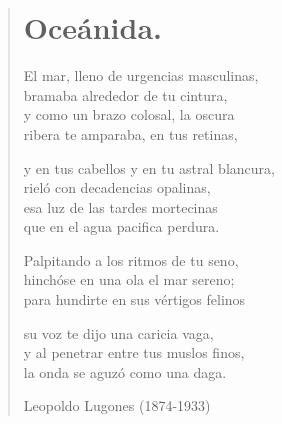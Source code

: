 \documentclass[12pt, twoside]{book}
\begin{document}
\begin{verse}
\begin{center}
\section{Oceánida.}
\end{center}

El mar, lleno de urgencias masculinas,\\
bramaba alrededor de tu cintura,\\
y como un brazo colosal, la oscura\\
ribera te amparaba, en tus retinas,
\newline

y en tus cabellos y en tu astral blancura,\\
rieló con decadencias opalinas,\\
esa luz de las tardes mortecinas\\
que en el agua pacifica perdura.
\newline

Palpitando a los ritmos de tu seno,\\
hinchóse en una ola el mar sereno;\\
para hundirte en sus vértigos felinos
\newline

su voz te dijo una caricia vaga,\\
y al penetrar entre tus muslos finos,\\
la onda se aguzó como una daga.
\newline

Leopoldo Lugones (1874-1933)
\end{verse}
\newpage
\end{document}
